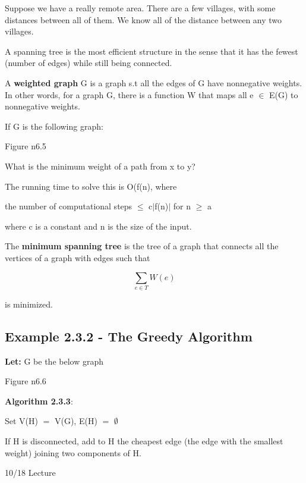 \documentclass{article}
\newcommand{\mt}[1]{\ensuremath{#1}}
\newcommand\ssc[2][\DefaultOpt]{%
  \def\DefaultOpt{#2}%
  \subsection[#1]{#2}%
}
\newcommand{\lt}[1]{\textbf{Let: } #1}
\newcommand{\mem}{\mt{\in} }
\newcommand{\es}{\mt{\emptyset} }        %
\newcommand{\av}[1]{\mt{|}#1\mt{|}}  %
\newcommand{\lse}{\mt{\operatorname{\leq}} }
\newcommand{\gre}{\mt{\operatorname{\geq}} }
\newcommand{\eql}{ \mt{\operatorname{=}} }
\newcommand{\eqn}[1]{\[#1\]}
\begin{document}
{{Suppose we have a really remote area. There are a few villages, with some distances between all of them. We know all of the distance between any two villages.

A spanning tree is the most efficient structure in the sense that it has the fewest (number of edges) while still being connected.

A \textbf{weighted graph} G is a graph s.t all the edges of G have nonnegative weights. In other words, for a graph G, there is a function W that maps all e \mem E(G) to nonnegative weights.

If G is the following graph:

Figure n6.5

What is the minimum weight of a path from x to y?

The running time to solve this is O(f(n), where

the number of computational steps \lse c\av{f(n)} for n \gre a

where c is a constant and n is the size of the input.

The \textbf{minimum spanning tree} is the tree of a graph that connects all the vertices of a graph with edges such that

\eqn{\sum_{e \mem T} W(e)}

is minimized.
}

\ssc{Example 2.3.2 - The Greedy Algorithm}{
\lt{G be the below graph}

Figure n6.6

\textbf{Algorithm 2.3.3}:

Set V(H) \eql V(G), E(H) \eql \es

If H is disconnected, add to H the cheapest edge (the edge with the smallest weight) joining two components of H.

}

}

10/18 Lecture
\end{document}
